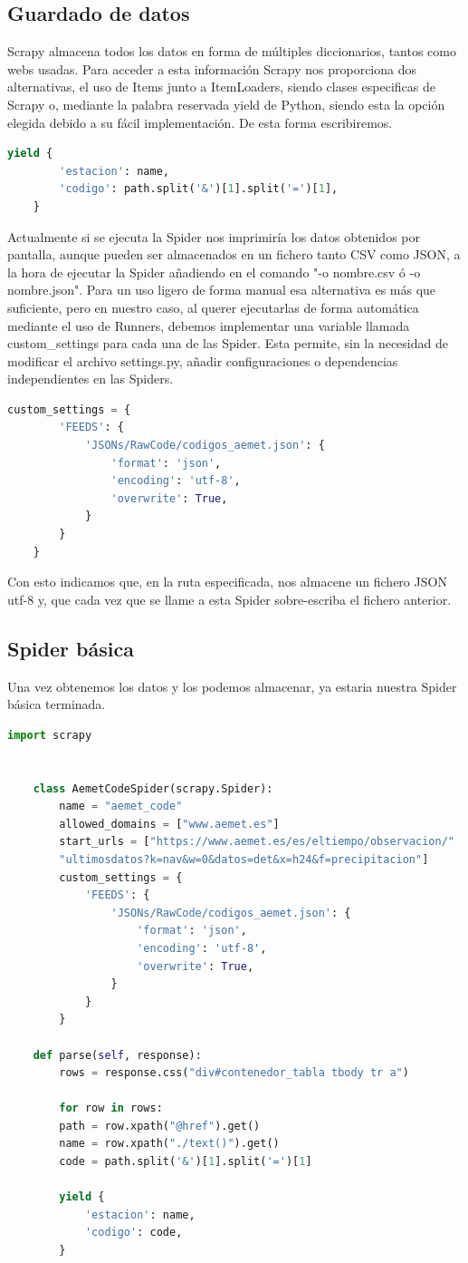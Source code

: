 \subsection{Guardado de datos}
Scrapy almacena todos los datos en forma de múltiples diccionarios, tantos como webs usadas. Para acceder a esta información Scrapy nos proporciona dos alternativas, el uso de Items junto a ItemLoaders, siendo clases especificas de Scrapy o, mediante la palabra reservada yield de Python, siendo esta la opción elegida debido a su fácil implementación.
De esta forma escribiremos.
\begin{lstlisting}[language=Python, caption={Guardar datos}]
	yield {
		'estacion': name,
		'codigo': path.split('&')[1].split('=')[1],
	}
\end{lstlisting}
Actualmente si se ejecuta la Spider nos imprimiría los datos obtenidos por pantalla, aunque pueden ser almacenados en un fichero tanto CSV como JSON, a la hora de ejecutar la Spider añadiendo en el comando "-o nombre.csv ó -o nombre.json".\newline
Para un uso ligero de forma manual esa alternativa es más que suficiente, pero en nuestro caso, al querer ejecutarlas de forma automática mediante el uso de Runners, debemos implementar una variable llamada custom\_settings para cada una de las Spider. Esta permite, sin la necesidad de modificar el archivo settings.py, añadir configuraciones o dependencias independientes en las Spiders.

\begin{lstlisting}[language=Python, caption={Confugurar guardado en JSON}]
	custom_settings = {
		'FEEDS': {
			'JSONs/RawCode/codigos_aemet.json': {
				'format': 'json',
				'encoding': 'utf-8',
				'overwrite': True,
			}
		}
	}
\end{lstlisting}
Con esto indicamos que, en la ruta especificada, nos almacene un fichero JSON utf-8 y, que cada vez que se llame a esta Spider sobre-escriba el fichero anterior.

\subsection{Spider básica}
Una vez obtenemos los datos y los podemos almacenar, ya estaria nuestra Spider básica terminada.
\begin{lstlisting}[language=Python, caption={Spider de ejemplo}]
	import scrapy
	
	
	class AemetCodeSpider(scrapy.Spider):
		name = "aemet_code"
		allowed_domains = ["www.aemet.es"]
		start_urls = ["https://www.aemet.es/es/eltiempo/observacion/"
		"ultimosdatos?k=nav&w=0&datos=det&x=h24&f=precipitacion"]
		custom_settings = {
			'FEEDS': {
				'JSONs/RawCode/codigos_aemet.json': {
					'format': 'json',
					'encoding': 'utf-8',
					'overwrite': True,
				}
			}
		}
	
	def parse(self, response):
		rows = response.css("div#contenedor_tabla tbody tr a")
		
		for row in rows:
		path = row.xpath("@href").get()
		name = row.xpath("./text()").get()
		code = path.split('&')[1].split('=')[1]
		
		yield {
			'estacion': name,
			'codigo': code,
		}
\end{lstlisting}


